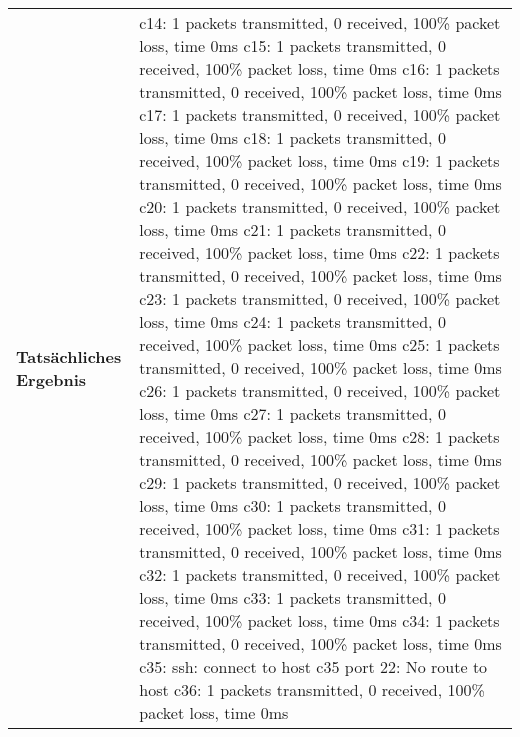 \begin{longtable}{p{4.5cm}p{11.5cm}}
\cellcolor{heading}\textbf{Tatsächliches Ergebnis} & 
c14: 1 packets transmitted, 0 received, 100\% packet loss, time 0ms \newline
c15: 1 packets transmitted, 0 received, 100\% packet loss, time 0ms \newline
c16: 1 packets transmitted, 0 received, 100\% packet loss, time 0ms \newline
c17: 1 packets transmitted, 0 received, 100\% packet loss, time 0ms \newline 
c18: 1 packets transmitted, 0 received, 100\% packet loss, time 0ms \newline
c19: 1 packets transmitted, 0 received, 100\% packet loss, time 0ms \newline
c20: 1 packets transmitted, 0 received, 100\% packet loss, time 0ms \newline
c21: 1 packets transmitted, 0 received, 100\% packet loss, time 0ms \newline
c22: 1 packets transmitted, 0 received, 100\% packet loss, time 0ms \newline
c23: 1 packets transmitted, 0 received, 100\% packet loss, time 0ms \newline
c24: 1 packets transmitted, 0 received, 100\% packet loss, time 0ms \newline
c25: 1 packets transmitted, 0 received, 100\% packet loss, time 0ms \newline
c26: 1 packets transmitted, 0 received, 100\% packet loss, time 0ms \newline
c27: 1 packets transmitted, 0 received, 100\% packet loss, time 0ms \newline
c28: 1 packets transmitted, 0 received, 100\% packet loss, time 0ms \newline
c29: 1 packets transmitted, 0 received, 100\% packet loss, time 0ms \newline
c30: 1 packets transmitted, 0 received, 100\% packet loss, time 0ms \newline
c31: 1 packets transmitted, 0 received, 100\% packet loss, time 0ms \newline
c32: 1 packets transmitted, 0 received, 100\% packet loss, time 0ms \newline
c33: 1 packets transmitted, 0 received, 100\% packet loss, time 0ms \newline
c34: 1 packets transmitted, 0 received, 100\% packet loss, time 0ms \newline
c35: ssh: connect to host c35 port 22: No route to host
c36: 1 packets transmitted, 0 received, 100\% packet loss, time 0ms \newline

\end{longtable}

